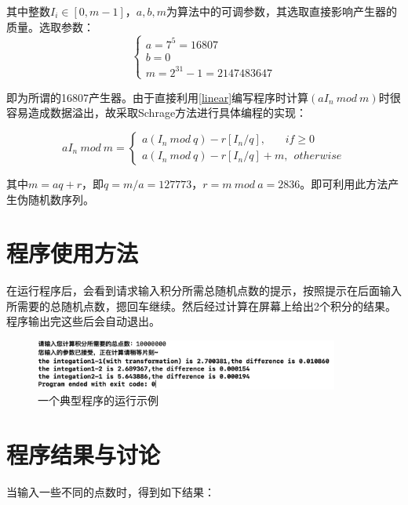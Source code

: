 \documentclass[a4paper,11pt]{article}
\begin{document}
其中整数$I_{i} \in [0,m-1]$，$a,b,m$为算法中的可调参数，其选取直接影响产生器的质量。选取参数：
\begin{equation}
\left\{
\begin{array}{l}
	a = 7^{5} = 16807 \\
	b = 0 \\
	m = 2^{31}-1 = 2147483647
\end{array}
\right.
\end{equation}

即为所谓的16807产生器。由于直接利用\ref{linear}编写程序时计算$(aI_{n} \ mod \ m )$时很容易造成数据溢出，故采取Schrage方法进行具体编程的实现：

\begin{equation}
	aI_{n} \ mod \ m = \left\{
	\begin{array}{l}
		a(I_{n}\ mod \ q) - r[I_{n}/q],\ \ \ \ \ \ \ \ if \geq 0 \\
		a(I_{n}\ mod \ q) - r[I_{n}/q] + m,\ \ otherwise	
			\end{array}
	\right.
\end{equation}

其中$m=aq+r$，即$q=m/a=127773$，$r=m \ mod \ a=2836$。即可利用此方法产生伪随机数序列。



\section{程序使用方法}
在运行程序后，会看到请求输入积分所需总随机点数的提示，按照提示在后面输入所需要的总随机点数，摁回车继续。然后经过计算在屏幕上给出2个积分的结果。程序输出完这些后会自动退出。
\begin{figure}[!htbp]        
\centering
\includegraphics[width=10cm]{example.png}      
\caption{ 一个典型程序的运行示例}      
\end{figure}


\section{程序结果与讨论}
当输入一些不同的点数时，得到如下结果：
\end{document}
